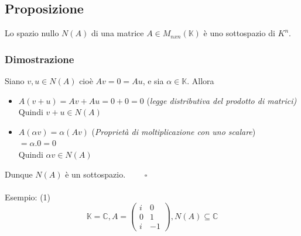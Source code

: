\documentclass[12pt]{article}
\begin{document}
\subsection{Proposizione}

Lo spazio nullo $N(A)$ di una matrice $A \in M_{nxn} (\mathbb{K})$ è uno sottospazio di $K^n$.

\subsubsection{Dimostrazione}

Siano $v, u \in N(A)$ cioè $Av = 0 = Au$, e sia $\alpha \in \mathbb{K}$. Allora
\begin{itemize}
    \item $A(v+u) = Av + Au = 0 + 0 = 0$ (\textit{legge distributiva del prodotto di matrici)}\\
    Quindi $v+u \in N(A)$
    \item $A(\alpha v) = \alpha(Av)$ (\textit{Proprietà di moltiplicazione con uno scalare})\\
    $= \alpha . 0 = 0$\\
    Quindi $\alpha v \in N(A)$
\end{itemize}
Dunque $N(A)$ è un sottospazio. $\quad \quad \square$
\\\\
Esempio:
(1)
\[\mathbb{K} = \mathbb{C}, A = \begin{pmatrix}
    i & 0\\
    0 & 1\\
    i & -1
\end{pmatrix}, N(A) \subseteq \mathbb{C}\]
\end{document}

